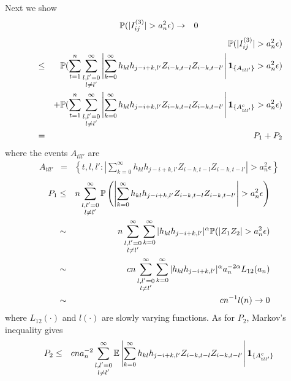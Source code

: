 \documentclass{article}
\begin{document}
Next we show
\begin{eqnarray*}
  \mathbb{P}(|I^{(3)}_{ij}| > a_n^2 \epsilon) &\to& 0
\end{eqnarray*}
\begin{eqnarray*}
  && \mathbb{P}(|I^{(3)}_{ij}| > a_n^2 \epsilon) \\
  &\leq& \mathbb{P}(\sum_{t=1}^n \sum_{\substack{l,l'=0 \\ l \neq l'}}^\infty
  \left|\sum_{k=0}^\infty h_{kl}h_{j-i+k,l'} Z_{i-k,t-l}Z_{i-k,t-l'}\right|
  \mathbf{1}_{\{A_{tll'}\}} > a_n^2 \epsilon ) \\
  && + \mathbb{P}(\sum_{t=1}^n \sum_{\substack{l,l'=0 \\ l \neq l'}}^\infty
  \left|\sum_{k=0}^\infty h_{kl}h_{j-i+k,l'} Z_{i-k,t-l}Z_{i-k,t-l'}\right|
  \mathbf{1}_{\{A^c_{tll'}\}} > a_n^2 \epsilon ) \\
  &=& P_1 + P_2
\end{eqnarray*}
where the events $A_{tll'}$ are
\begin{eqnarray*}
  A_{tll'} &=& \left\{t,l,l': \left|
      \sum_{k=0}^\infty h_{kl}h_{j-i+k,l'} Z_{i-k,t-l}Z_{i-k,t-l'}
    \right| > a_n^2 \epsilon \right\}
\end{eqnarray*}
\begin{eqnarray*}
  P_1 &\leq& n \sum_{\substack{l,l'=0 \\ l \neq l'}}^\infty \mathbb{P}\left(
    \left|\sum_{k=0}^\infty h_{kl}h_{j-i+k,l'} Z_{i-k,t-l}Z_{i-k,t-l'}\right| > a_n^2 \epsilon
  \right) \\
  &\sim& n \sum_{\substack{l,l'=0 \\ l \neq l'}}^\infty \sum_{k=0}^\infty |h_{kl}h_{j-i+k,l'}|^{\alpha} \mathbb{P}(|Z_1 Z_2| > a_n^2 \epsilon)
  \\
  &\sim& c n \sum_{\substack{l,l'=0 \\ l \neq l'}}^\infty
  \sum_{k=0}^\infty |h_{kl}h_{j-i+k,l'}|^{\alpha} a_n^{-2\alpha} L_{12}(a_n)\\  
  &\sim& c n^{-1} l(n)  \to 0
\end{eqnarray*}
where $L_{12}(\cdot)$ and $l(\cdot)$ are slowly varying functions. As
for $P_2$, Markov's inequality gives
\begin{eqnarray*}
  P_2 &\leq& c n a_n^{-2} \sum_{\substack{l,l'=0 \\ l \neq l'}}^\infty
  \mathbb{E}\left|\sum_{k=0}^\infty h_{kl}h_{j-i+k,l'}
    Z_{i-k,t-l}Z_{i-k,t-l'}\right| \mathbf{1}_{\{A^c_{tll'}\}}
\end{eqnarray*}
\end{document}
